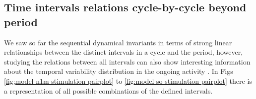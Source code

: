 


\subsection{Time intervals relations cycle-by-cycle beyond period}
We saw so far the sequential dynamical invariants in terms of strong linear relationships between the distinct intervals in a cycle and the period, however, studying the relations between all intervals can also show interesting information about the temporal variability distribution in the ongoing activity \cite{}. In Figs \ref{fig;model n1m stimulation pairplot} to \ref{fig:model so stimulation pairplot} there is a representation of all possible combinations of the defined intervals. 



